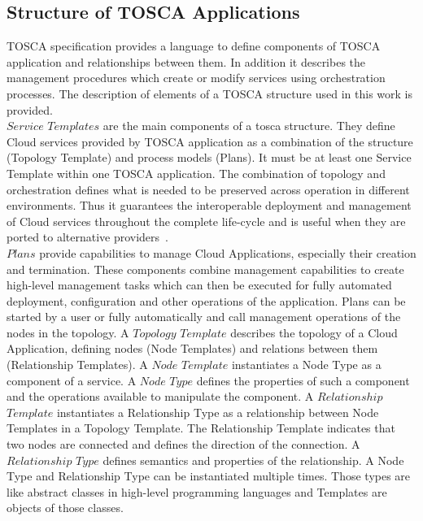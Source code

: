 \subsection*{Structure of TOSCA Applications}
TOSCA specification provides a language to define components of TOSCA application and relationships between them. %
In addition it describes the management procedures which create or modify services using orchestration processes.
The description of elements of a TOSCA structure used in this work is provided. \\
$Service$ $Templates$ are the main components of a \gls{tosca} structure. 
They define Cloud services provided by TOSCA application as a combination of the structure (Topology Template) and process models (Plans).
It must be at least one Service Template within one TOSCA application.
The combination of topology and orchestration defines what is needed to be preserved across operation in different environments.
Thus it guarantees the interoperable deployment and management of Cloud services throughout the complete life-cycle and is useful when they are ported to alternative providers~\cite{TOSCA-v1.0_book}. \\ %
$Plans$ provide capabilities to manage Cloud Applications, especially their creation and termination.
These components combine management capabilities to create high-level management tasks which can then be executed for fully automated deployment, configuration and other operations of the application.
Plans can be started by a user or fully automatically and call management operations of the nodes in the topology. %
A $Topology$ $Template$ describes the topology of a Cloud Application, defining nodes (Node Templates) and relations between them (Relationship Templates). %
A $Node$ $Template$ instantiates a Node Type as a component of a service. 
A $Node$ $Type$ defines the properties of such a component and the operations available to manipulate the component.
A $Relationship$ $Template$ instantiates a Relationship Type as a relationship between Node Templates in a Topology Template. 
The Relationship Template indicates that two nodes are connected and defines the direction of the connection.
A $Relationship$ $Type$ defines semantics and properties of the relationship.\label{subs:reltype} %
A Node Type and Relationship Type can be instantiated multiple times.
Those types are like abstract classes in high-level programming languages and Templates are objects of those classes.\\
